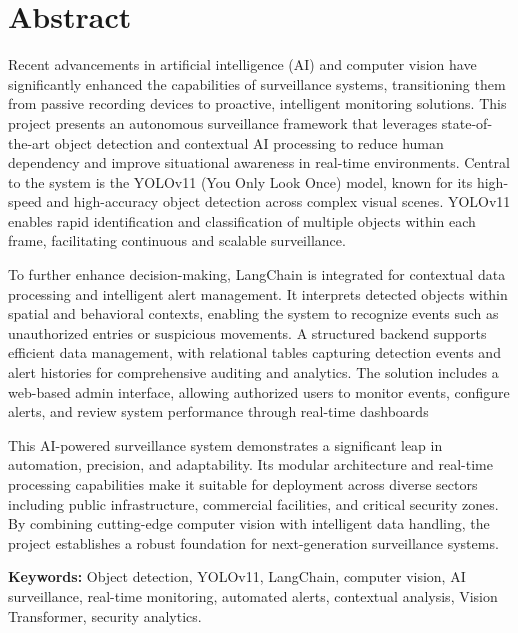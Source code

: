 \documentclass[12pt]{report}
\begin{document}
\newpage
\chapter*{Abstract}

{
    Recent advancements in artificial intelligence (AI) and computer vision have significantly enhanced the capabilities of surveillance systems, transitioning them from passive recording devices to proactive, intelligent monitoring solutions. This project presents an autonomous surveillance framework that leverages state-of-the-art object detection and contextual AI processing to reduce human dependency and improve situational awareness in real-time environments. Central to the system is the YOLOv11 (You Only Look Once) model, known for its high-speed and high-accuracy object detection across complex visual scenes. YOLOv11 enables rapid identification and classification of multiple objects within each frame, facilitating continuous and scalable surveillance.

To further enhance decision-making, LangChain is integrated for contextual data processing and intelligent alert management. It interprets detected objects within spatial and behavioral contexts, enabling the system to recognize events such as unauthorized entries or suspicious movements. A structured backend supports efficient data management, with relational tables capturing detection events and alert histories for comprehensive auditing and analytics. The solution includes a web-based admin interface, allowing authorized users to monitor events, configure alerts, and review system performance through real-time dashboards

This AI-powered surveillance system demonstrates a significant leap in automation, precision, and adaptability. Its modular architecture and real-time processing capabilities make it suitable for deployment across diverse sectors including public infrastructure, commercial facilities, and critical security zones. By combining cutting-edge computer vision with intelligent data handling, the project establishes a robust foundation for next-generation surveillance systems.

\vspace{1cm}
\noindent \textbf{Keywords:} Object detection, YOLOv11, LangChain, computer vision, AI surveillance, real-time monitoring, automated alerts, contextual analysis, Vision Transformer, security analytics.
}
\end{document}
